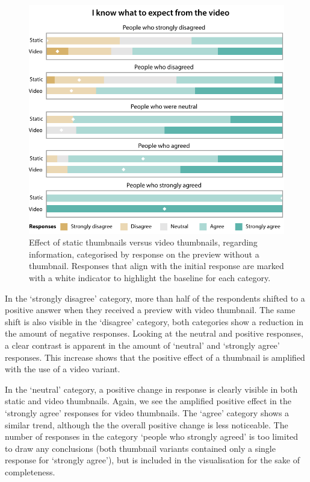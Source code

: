 \documentclass{../resources/sig-alternate-05-2015}
\begin{document}
\begin{figure}[h]
	\caption{Effect of static thumbnails versus video thumbnails, regarding information, categorised by response on the preview without a thumbnail. Responses that align with the initial response are marked with a white indicator to highlight the baseline for each category.}
	\label{figure:information static versus video}
	\includegraphics[width=\linewidth]{resources/information_static_video}
\end{figure}

In the `strongly disagree' category, more than half of the respondents shifted to a positive answer when they received a preview with video thumbnail. The same shift is also visible in the `disagree' category, both categories show a reduction in the amount of negative responses. Looking at the neutral and positive responses, a clear contrast is apparent in the amount of `neutral' and `strongly agree' responses. This increase shows that the positive effect of a thumbnail is amplified with the use of a video variant.

In the `neutral' category, a positive change in response is clearly visible in both static and video thumbnails. Again, we see the amplified positive effect in the `strongly agree' responses for video thumbnails. The `agree' category shows a similar trend, although the the overall positive change is less noticeable. The number of responses in the category `people who strongly agreed' is too limited to draw any conclusions (both thumbnail variants contained only a single response for `strongly agree'), but is included in the visualisation for the sake of completeness.
\end{document}
